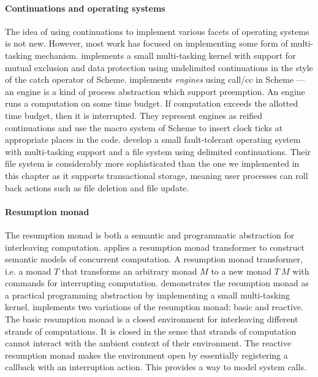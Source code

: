 \documentclass[12pt,phd,lfcs,twoside,openright,logo,leftchapter,normalheadings]{infthesis}
\theoremstyle{plain}
\theoremstyle{definition}
\begin{document}
\paragraph{Continuations and operating systems}
The idea of using continuations to implement various facets of
operating systems is not new. However, most work has focused on
implementing some form of multi-tasking mechanism.
%
\citet{Wand80} implements a small multi-tasking kernel with support
for mutual exclusion and data protection using undelimited
continuations in the style of the catch operator of Scheme.
\citet{DybvigH89} implements \emph{engines} using call/cc in Scheme
--- an engine is a kind of process abstraction which support
preemption. An engine runs a computation on some time budget. If
computation exceeds the allotted time budget, then it is
interrupted. They represent engines as reified continuations and use
the macro system of Scheme to insert clock ticks at appropriate places
in the code. %
\citet{KiselyovS07a} develop a small fault-tolerant operating system
with multi-tasking support and a file system using delimited
continuations. Their file system is considerably more sophisticated
than the one we implemented in this chapter as it supports
transactional storage, meaning user processes can roll back actions
such as file deletion and file update.

\paragraph{Resumption monad}
The resumption monad is both a semantic and programmatic abstraction
for interleaving computation. \citet{Papaspyrou01} applies a
resumption monad transformer to construct semantic models of
concurrent computation. A resumption monad transformer, i.e. a monad
$T$ that transforms an arbitrary monad $M$ to a new monad $T~M$ with
commands for interrupting computation.
%
\citet{Harrison06} demonstrates the resumption monad as a practical
programming abstraction by implementing a small multi-tasking
kernel. \citeauthor{Harrison06} implements two variations of the
resumption monad: basic and reactive. The basic resumption monad is a
closed environment for interleaving different strands of
computations. It is closed in the sense that strands of computation
cannot interact with the ambient context of their environment. The
reactive resumption monad makes the environment open by essentially
registering a callback with an interruption action. This provides a
way to model system calls.
\end{document}
